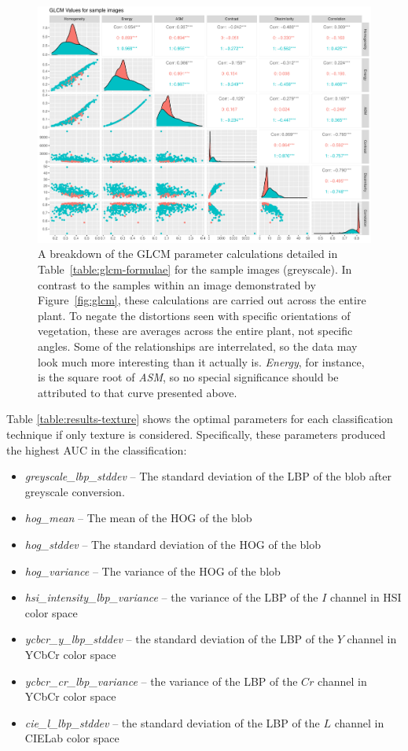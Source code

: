 \documentclass[letterpaper, notitlepage]{report}
\begin{document}
\begin{figure}[H]
	\centering
	\includegraphics[width=0.9\linewidth]{./figures/glcm-pairs.pdf}
	\caption[GLCM parameter correlation assessment]{A breakdown of the GLCM parameter calculations detailed in Table~\ref{table:glcm-formulae} for the sample images (greyscale). In contrast to the samples within an image demonstrated by Figure~\ref{fig:glcm}, these calculations are carried out across the entire plant. To negate the distortions seen with specific orientations of vegetation, these are averages across the entire plant, not specific angles. Some of the relationships are interrelated, so the data may look much more interesting than it actually is. \textit{Energy}, for instance, is the square root of \textit{ASM}, so no special significance should be attributed to that curve presented above.}
\end{figure} 

Table \ref{table:results-texture} shows the optimal parameters for each classification technique if only texture is considered. Specifically, these parameters produced the highest AUC in the classification:
\begin{itemize}
	\item{\textit{greyscale\_lbp\_stddev} -- The standard deviation of the LBP of the blob after greyscale conversion.}
	\item{\textit{hog\_mean} -- The mean of the HOG of the blob}
	\item{\textit{hog\_stddev} -- The standard deviation of the HOG of the blob}
	\item{\textit{hog\_variance} -- The variance of the HOG of the blob}
	\item{\textit{hsi\_intensity\_lbp\_variance} -- the variance of the LBP of the $I$ channel in HSI color space}
	\item{\textit{ycbcr\_y\_lbp\_stddev} -- the standard deviation of the LBP of the $Y$ channel in YCbCr color space}
	\item{\textit{ycbcr\_cr\_lbp\_variance} -- the variance of the LBP of the $Cr$ channel in YCbCr color space}	
	\item{\textit{cie\_l\_lbp\_stddev} -- the standard deviation of the LBP of the $L$ channel in CIELab color space}
\end{itemize}
\end{document}
